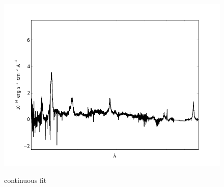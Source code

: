 \documentclass[usenatbib]{mn2e}
\begin{document}
\begin{figure}
\begin{center}
\hspace{5mm}
\includegraphics[width=0.49\linewidth,angle=0]{no_continuous_5.png}\\

\end{center} 
\caption{continuous fit \label{fig:landscape}}   
\end{figure}

\newpage
\end{document}
